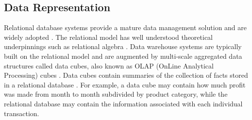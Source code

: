 \subsection{Data Representation}
%
%
Relational database systems provide a mature data management solution and are widely adopted \cite{ramakrishnan2000database}. The relational model has well understood theoretical underpinnings such as relational algebra \cite{clifford1985algebra}. Data warehouse systems are typically built on the relational model and are augmented by multi-scale aggregated data structures called data cubes, also known as OLAP (OnLine Analytical Processing) cubes \cite{gray1997data, codd1993providing}. Data cubes contain summaries of the collection of facts stored in a relational database \cite{chaudhuri1997overview}. For example, a data cube may contain how much profit was made from month to month subdivided by product category, while the relational database may contain the information associated with each individual transaction.

